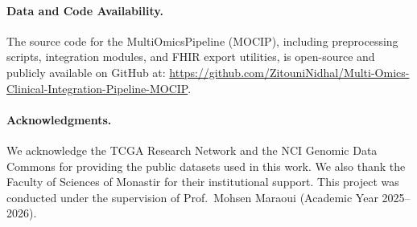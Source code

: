 \documentclass[runningheads]{llncs}
\begin{document}
\paragraph{Data and Code Availability.}
{
The source code for the MultiOmicsPipeline (MOCIP), including preprocessing scripts, integration modules, and FHIR export utilities, is open-source and publicly available on GitHub at: \url{https://github.com/ZitouniNidhal/Multi-Omics-Clinical-Integration-Pipeline-MOCIP}.
}

\paragraph{Acknowledgments.}
\noindent We acknowledge the TCGA Research Network and the NCI Genomic Data Commons for providing the public datasets used in this work. We also thank the Faculty of Sciences of Monastir for their institutional support. This project was conducted under the supervision of Prof.\ Mohsen Maraoui (Academic Year 2025--2026).

\label{page:before_refs}



\end{document}

